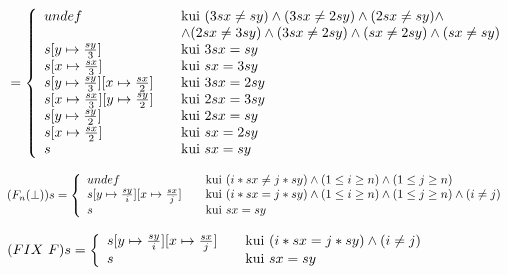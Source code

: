 \(
\\
\\
=
\left \{ \begin{array}{l l}
  undef & \quad \text{kui}\ (3sx \neq sy) \wedge (3sx \neq 2sy) \wedge (2sx \neq sy) \wedge \\
        & \quad \wedge (2sx \neq 3sy) \wedge (3sx \neq 2sy) \wedge (sx \neq 2sy) \wedge (sx \neq sy) \\
  s[y \mapsto \frac{sy}{3} ] & \quad \text{kui}\ 3sx = sy \\
  s[x \mapsto \frac{sx}{3} ] & \quad \text{kui}\ sx = 3sy \\
  s[y \mapsto \frac{sy}{3}][x \mapsto \frac{sx}{2} ] & \quad \text{kui}\ 3sx = 2sy \\
  s[x \mapsto \frac{sx}{3}][y \mapsto \frac{sy}{2} ] & \quad \text{kui}\ 2sx = 3sy \\
  s[y \mapsto \frac{sy}{2}] & \quad \text{kui}\ 2sx = sy \\
  s[x \mapsto \frac{sx}{2}] & \quad \text{kui}\ sx = 2sy \\
  s & \quad \text{kui}\ sx = sy \\
\end{array} \right.
\)

\(
\\
\\
(F_n(\bot)) s=
\left \{ \begin{array}{l l}
  undef & \quad \text{kui}\ (i * sx \neq j * sy) \wedge (1 \leq i \geq n) \wedge (1 \leq j \geq n) \\
  s[y \mapsto \frac{sy}{i}][x \mapsto \frac{sx}{j} ] & \quad \text{kui}\ (i * sx = j * sy) \wedge (1 \leq i \geq n) \wedge (1 \leq j \geq n) \wedge (i \neq j) \\
  s & \quad \text{kui}\ sx = sy \\
\end{array} \right.
\)

\(
\\
\\
(FIX \ F) s =
\left \{ \begin{array}{l l}
  s[y \mapsto \frac{sy}{i}][x \mapsto \frac{sx}{j} ] & \quad \text{kui}\ (i * sx = j * sy) \wedge (i \neq j) \\
  s & \quad \text{kui}\ sx = sy \\
\end{array} \right.
\)
